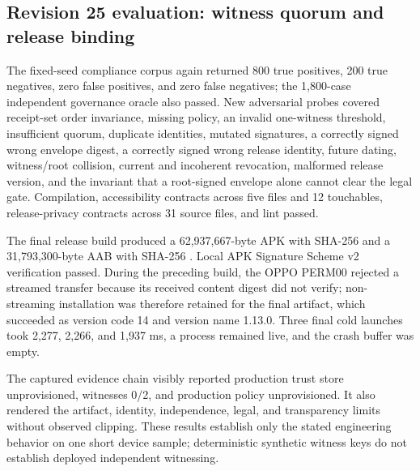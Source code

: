 

\subsection{Revision 25 evaluation: witness quorum and release binding}

The fixed-seed compliance corpus again returned 800 true positives, 200 true negatives, zero false positives, and zero false negatives; the 1,800-case independent governance oracle also passed. New adversarial probes covered receipt-set order invariance, missing policy, an invalid one-witness threshold, insufficient quorum, duplicate identities, mutated signatures, a correctly signed wrong envelope digest, a correctly signed wrong release identity, future dating, witness/root collision, current and incoherent revocation, malformed release version, and the invariant that a root-signed envelope alone cannot clear the legal gate. Compilation, accessibility contracts across five files and 12 touchables, release-privacy contracts across 31 source files, and lint passed.

The final release build produced a 62,937,667-byte APK with SHA-256 \texttt{} and a 31,793,300-byte AAB with SHA-256 \texttt{}. Local APK Signature Scheme v2 verification passed. During the preceding build, the OPPO PERM00 rejected a streamed transfer because its received content digest did not verify; non-streaming installation was therefore retained for the final artifact, which succeeded as version code 14 and version name 1.13.0. Three final cold launches took 2,277, 2,266, and 1,937 ms, a process remained live, and the crash buffer was empty.

The captured evidence chain visibly reported production trust store unprovisioned, witnesses 0/2, and production policy unprovisioned. It also rendered the artifact, identity, independence, legal, and transparency limits without observed clipping. These results establish only the stated engineering behavior on one short device sample; deterministic synthetic witness keys do not establish deployed independent witnessing.
